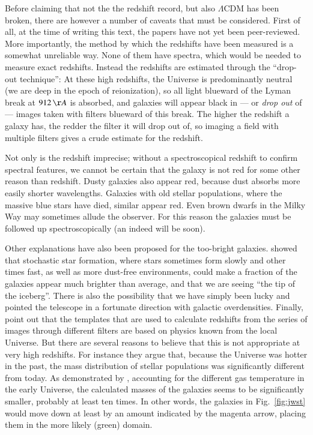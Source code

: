 \documentclass[useAMS,usenatbib,bibyear]{aa}
\begin{document}
Before claiming that not the the redshift record, but also $\Lambda$CDM has been broken, there are however a number of caveats that must be considered.
First of all, at the time of writing this text, the papers have not yet been peer-reviewed.
More importantly, the method by which the redshifts have been measured is a somewhat unreliable way. None of them have spectra, which would be needed to measure exact redshifts. Instead the redshifts are estimated through the ``drop-out technique'': At these high redshifts, the Universe is predominantly neutral (we are deep in the epoch of reionization), so all light blueward of the Lyman break at $912\,{\AA}$ is absorbed, and galaxies will appear black in --- or \emph{drop out} of --- images taken with filters blueward of this break.
The higher the redshift a galaxy has, the redder the filter it will drop out of, so imaging a field with multiple filters gives a crude estimate for the redshift.

Not only is the redshift imprecise; without a spectroscopical redshift to confirm spectral features, we cannot be certain that the galaxy is not red for some other reason than redshift. Dusty galaxies also appear red, because dust absorbs more easily shorter wavelengths. Galaxies with old stellar populations, where the massive blue stars have died, similar appear red. Even brown dwarfs in the Milky Way may sometimes allude the observer.
For this reason the galaxies must be followed up spectroscopically (an indeed will be soon).

Other explanations have also been proposed for the too-bright galaxies.
\citet{Mason2022} showed that stochastic star formation, where stars sometimes form slowly and other times fast, as well as more dust-free environments, could make a fraction of the galaxies appear much brighter than average, and that we are seeing ``the tip of the iceberg''.
There is also the possibility that we have simply been lucky and pointed the telescope in a fortunate direction with galactic overdensities.
Finally, \citet{Steinhardt2022} point out that the templates that are used to calculate redshifts from the series of images through different filters are based on physics known from the local Universe. But there are several reasons to believe that this is not appropriate at very high redshifts. For instance they argue that, because the Universe was hotter in the past, the mass distribution of stellar populations was significantly different from today.
As demonstrated by \citet{Sneppen2022}, accounting for the different gas temperature in the early Universe, the calculated masses of the galaxies seems to be significantly smaller, probably at least ten times.
In other words, the galaxies in Fig.~\ref{fig:jwst} would move down at least by an amount indicated by the magenta arrow, placing them in the more likely (green) domain.
\end{document}
